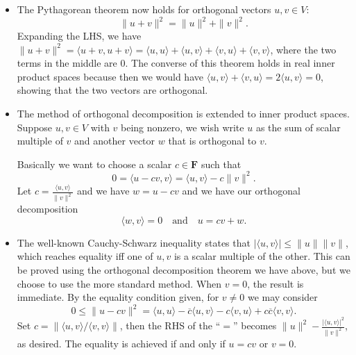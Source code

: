 \documentclass[11pt]{article}
\newcommand{\F}{\mathbf{F}}
\newcommand{\conj}[1]{\overline{#1}}
\newcommand{\inp}[2]{\langle #1, #2 \rangle}
\newcommand{\nm}[1]{\|#1\|}
\newcommand{\abs}[1]{\lvert #1 \rvert}
\begin{document}
\begin{itemize}
\begin{itemize}
        \item The Pythagorean theorem now holds for orthogonal vectors $u,v \in V$: $$\|u+v\|^2 = \|u\|^2 + \|v\|^2.$$ Expanding the LHS, we have $\|u+v\|^2 = \inp{u+v}{u+v} = \inp{u}{u} + \inp{u}{v} + \inp{v}{u} + \inp{v}{v}$, where the two terms in the middle are 0.
        The converse of this theorem holds in real inner product spaces because then we would have $\inp{u}{v}+\inp{v}{u} = 2\inp{u}{v} = 0$, showing that the two vectors are orthogonal.
        \item The method of orthogonal decomposition is extended to inner product spaces. Suppose $u,v \in V$ with $v$ being nonzero, we wish write $u$ as the sum of scalar multiple of $v$ and another vector $w$ that is orthogonal to $v$.
        
        Basically we want to choose a scalar $c \in \F$ such that $$0 = \inp{u-cv}{v} = \inp{u}{v} - c\|v\|^2.$$ Let $c = \frac{\inp{u}{v}}{\|v\|^2}$ and we have $w = u - cv$ and we have our orthogonal decomposition $$\inp{w}{v} = 0 \quad \text{and} \quad u = cv+w.$$
        \item The well-known Cauchy-Schwarz inequality states that $\abs{\inp{u}{v}} \leq \|u\|\|v\|$, which reaches equality iff one of $u,v$ is a scalar multiple of the other. This can be proved using the orthogonal decomposition theorem we have above, but we choose to use the more standard method. When $v = 0$, the result is immediate. By the equality condition given, for $v \not= 0$ we may consider $$0 \leq \|u - cv\|^2 = \inp{u}{u} - \conj{c}\inp{u}{v} - c\inp{v}{u} + c\conj{c}\inp{v}{v}.$$ Set $c = \nm{\inp{u}{v}/\inp{v}{v}}$, then the RHS of the ``$=$'' becomes $ \nm{u}^2 - \frac{\abs{\inp{u}{v}}^2}{\nm{v}^2}$, as desired. The equality is achieved if and only if $u = cv$ or $v = 0$.
        

\end{itemize}
\end{itemize}
\end{document}
